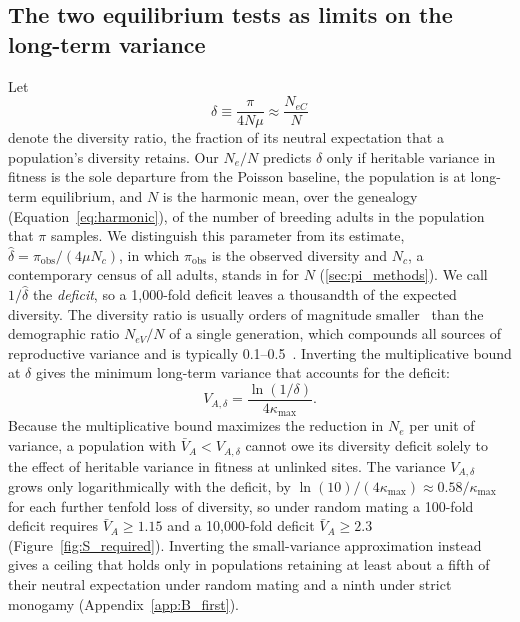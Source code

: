 \documentclass{article}
\begin{document}
\subsection{The two equilibrium tests as limits on the long-term variance}\label{sec:conditions}
Let
\begin{equation}
    \delta \equiv \frac{\pi}{4N\mu} \approx \frac{N_{eC}}{N}
\end{equation}
denote the diversity ratio, the fraction of its neutral expectation that a population's diversity retains. Our $N_e/N$ predicts $\delta$ only if heritable variance in fitness is the sole departure from the Poisson baseline, the population is at long-term equilibrium, and $N$ is the harmonic mean, over the genealogy (Equation~\eqref{eq:harmonic}), of the number of breeding adults in the population that $\pi$ samples. We distinguish this parameter from its estimate, $\hat{\delta} = \pi_\text{obs}/(4\mu N_c)$, in which $\pi_\text{obs}$ is the observed diversity and $N_c$, a contemporary census of all adults, stands in for $N$ (\autoref{sec:pi_methods}). We call $1/\hat{\delta}$ the \emph{deficit}, so a 1,000-fold deficit leaves a thousandth of the expected diversity. The diversity ratio is usually orders of magnitude smaller~\cite{buffalo2021,lewin2026} than the demographic ratio $N_{eV}/N$ of a single generation, which compounds all sources of reproductive variance and is typically 0.1--0.5~\cite{frankham1995}. Inverting the multiplicative bound at $\delta$ gives the minimum long-term variance that accounts for the deficit:
\begin{equation}
    V_{A,\delta} = \frac{\ln(1/\delta)}{4\kappa_\text{max}}. \label{eq:vamax_mult}
\end{equation}
Because the multiplicative bound maximizes the reduction in $N_e$ per unit of variance, a population with $\bar{V}_A < V_{A,\delta}$ cannot owe its diversity deficit solely to the effect of heritable variance in fitness at unlinked sites. The variance $V_{A,\delta}$ grows only logarithmically with the deficit, by $\ln(10)/(4\kappa_\text{max}) \approx 0.58/\kappa_\text{max}$ for each further tenfold loss of diversity, so under random mating a 100-fold deficit requires $\bar{V}_A \ge 1.15$ and a 10,000-fold deficit $\bar{V}_A \ge 2.3$ (Figure~\ref{fig:S_required}). Inverting the small-variance approximation instead gives a ceiling that holds only in populations retaining at least about a fifth of their neutral expectation under random mating and a ninth under strict monogamy (Appendix~\ref{app:B_first}).
\end{document}
